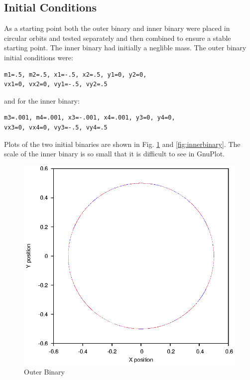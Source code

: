 \documentclass[a4paper,12pt]{article}
\begin{document}
\subsection{Initial Conditions}
As a starting point both the outer binary and inner binary were placed in circular orbits and tested separately and then combined to ensure a stable
starting point. The inner binary had initially a neglible mass.
The outer binary initial conditions were:
\begin{lstlisting}
m1=.5, m2=.5, x1=-.5, x2=.5, y1=0, y2=0,
vx1=0, vx2=0, vy1=-.5, vy2=.5
\end{lstlisting}
and for the inner binary:
\begin{lstlisting}
m3=.001, m4=.001, x3=-.001, x4=.001, y3=0, y4=0, 
vx3=0, vx4=0, vy3=-.5, vy4=.5
\end{lstlisting}
Plots of the two initial binaries are shown in Fig. \ref{fig:outerbinary} and 
\ref{fig:innerbinary}. The scale of the inner binary is so small that it is difficult
to see in GnuPlot.
\begin{figure}[H]
\centering
\includegraphics[width=.9\textwidth]{./2016results/outerbinary/Orbit.eps}
\caption{Outer Binary}
\label{fig:outerbinary}
\end{figure}
\end{document}
